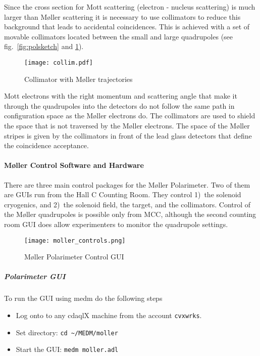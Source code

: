 {Since the cross section for Mott scattering (electron - nucleus
scattering) is much larger than M\o ller scattering it is necessary to
use collimators to reduce this background that leads to accidental
coincidences. This is achieved with a set of movable collimators
located between the small and large quadrupoles (see
fig.~\ref{fig:polsketch} and \ref{colscetch}).
%
\begin{figure}[htb]
\texttt{[image: collim.pdf]}
\begin{center}
\caption{Collimator with M\o ller trajectories\label{colscetch}}
\end{center}
\end{figure}
Mott electrons with the right momentum and scattering angle that make
it through the quadrupoles into the detectors do not follow the same
path in configuration space as the M\o ller electrons do.  The
collimators are used to shield the space that is not traversed by the
M\o ller electrons. The space of the M\o ller stripes is given by the
collimators in front of the lead glass detectors that define the
coincidence acceptance.
%

\paragraph{M\o ller Control Software and Hardware}
There are three main control packages for the M\o ller Polarimeter.
Two of them are GUIs run from the Hall C Counting Room. They control
1)~the solenoid cryogenics, and 2)~the solenoid field, the target, and
the collimators. Control of the M\o ller quadrupoles is possible only
from MCC, although the second counting room GUI does allow
experimenters to monitor the quadrupole settings.


\begin{figure}[htb]
  \begin{center}
  \texttt{[image: moller\_controls.png]}
  \caption{M\o ller Polarimeter Control GUI\label{molpolmedm}}
  \end{center}
\end{figure}
%

\subparagraph{Polarimeter GUI}

To run the GUI using medm do the following steps
\begin{itemize}
\item Log onto to any cdaqlX machine from the account \texttt{cvxwrks}.
\item Set directory: \texttt{cd \textasciitilde{}/MEDM/moller}
\item Start the GUI: \texttt{medm moller.adl}
\end{itemize}
%

}
